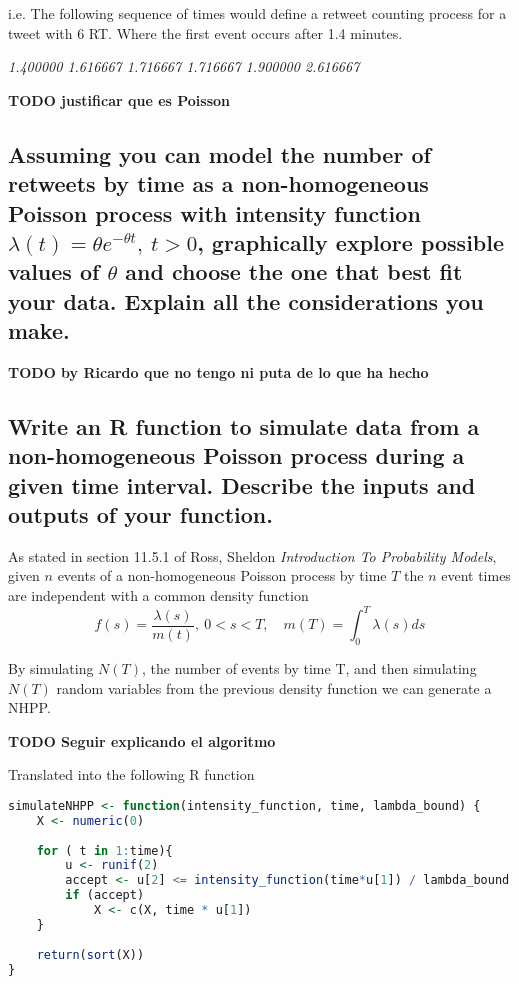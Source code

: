 i.e. The following sequence of times would define a retweet counting process for a tweet with 6 RT. Where the first event occurs after 1.4 minutes.

\begin{center}
\textit{1.400000    1.616667    1.716667    1.716667    1.900000    2.616667}
\end{center}

\textbf{TODO justificar que es Poisson}

\subsection{Assuming you can model the number of retweets by time as a non-homogeneous Poisson process with intensity function $ \lambda (t) = \theta e^{-\theta t},\ t>0$, graphically explore possible values of $\theta$ and choose the one that best fit your data. Explain all the considerations you make.}

\textbf{TODO by Ricardo que no tengo ni puta de lo que ha hecho}

\subsection{Write an R function to simulate data from a non-homogeneous Poisson process during a given time interval. Describe the inputs and outputs of your function.}

As stated in section 11.5.1 of Ross, Sheldon \textit{Introduction To Probability Models}, given $n$ events of a non-homogeneous Poisson process by time $T$ the $n$ event times are independent with a common density function
\[f(s) = \frac{\lambda(s)}{m(t)},\ 0<s<T, \quad m(T) = \int^T_0\lambda(s)ds\]

By simulating $N(T)$, the number of events by time T, and then simulating $N(T)$ random variables from the previous density function we can generate a NHPP.

\textbf{TODO Seguir explicando el algoritmo}

Translated into the following R function
\begin{lstlisting}[language=r]
simulateNHPP <- function(intensity_function, time, lambda_bound) {
	X <- numeric(0)
	
	for ( t in 1:time){
		u <- runif(2)
		accept <- u[2] <= intensity_function(time*u[1]) / lambda_bound
		if (accept)
			X <- c(X, time * u[1])
	}
		
	return(sort(X))
}
\end{lstlisting}
